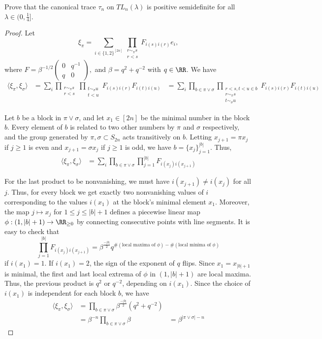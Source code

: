 \documentclass{article}
\begin{document}
 Prove that the canonical trace $\tau_n$ on $TL_n(\lambda)$ is positive semidefinite for all $\lambda \in (0, \frac{1}{4}]$.
  \begin{proof}
    Let $$\xi_\pi = \sum_{i \in \{1,2\}^{[2n]}} \prod_{\substack{r \sim_\pi s\\ r< s}} F_{i(s)i(r)} e_i,$$
      where $F = \beta^{-1/2} \begin{pmatrix} 0 & q^{-1} \\ q & 0 \end{pmatrix},$ and $\beta = q^2 + q^{-2}$ with $q \in \RR$.   We have
      \begin{align*}
        \langle \xi_\pi, \xi_\sigma \rangle & = \sum_i \prod_{\substack{r \sim_\pi s\\ r < s}} \prod_{\substack{t \sim_\sigma u\\ t < u}} F_{i(s)i(r)} F_{i(t) i(u)} 
        & = \sum_i \prod_{b \in \pi \vee \sigma} \prod_{\substack{r<s, t<u \in b\\ r \sim_\pi s \\ t \sim_\sigma u }} F_{i(s)i(r)} F_{i(t) i(u)} 
      \end{align*}

      Let $b$ be a block in $\pi \vee \sigma$, and let $x_1 \in [2n]$ be the minimal number in the block $b$.  Every element of $b$ is related to two other numbers by $\pi$ and $\sigma$ respectively, and the group generated by $\pi, \sigma \subset S_{2n}$ acts transitively on $b$.  Letting $x_{j+1} = \pi x_{j}$ if $j \ge 1$ is even and $x_{j+1} = \sigma x_j$ if $j \ge 1$ is odd, we have $b = \{x_j\}_{j = 1}^{|b|}$.  Thus,
      \begin{align*}
        \langle \xi_\pi, \xi_\sigma \rangle &  = \sum_i \prod_{b \in \pi \vee \sigma} \prod_{j = 1}^{|b|} F_{i(x_j)i(x_{j+1})}  
      \end{align*}

      For the last product to be nonvanishing, we must have $i(x_{j+1}) \neq i(x_{j})$ for all $j$.  Thus, for every block we get exactly two nonvanishing values of $i$ corresponding to the values $i(x_1)$ at the block's minimal element $x_1$.  Moreover, the map $j \mapsto x_j$ for $1 \le j \le |b| + 1$ defines a piecewise linear map $\phi: (1, |b| +1) \to \RR_{\ge 0}$ by connecting consecutive points with line segments.  It is easy to check that
      $$ \prod_{j = 1}^{|b|} F_{i(x_j)i(x_{j+1})}   = \beta^{\frac{-|b|}{2}} q^{\# (\text{local maxima of } \phi)- \# (\text{local minima of } \phi)} $$
      if $i(x_1) = 1$.  If $i(x_1) = 2$, the sign of the exponent of $q$ flips.   Since $x_1 = x_{|b| + 1}$ is minimal, the first and last local extrema of $\phi$ in $(1, |b| + 1)$ are local maxima.  Thus, the previous product is $q^2$ or $q^{-2}$, depending on $i(x_1)$.  Since the choice of $i(x_1)$ is independent for each block $b$, we have
\begin{align*}
  \langle \xi_\pi, \xi_\sigma \rangle &  = \prod_{b \in \pi \vee \sigma} \beta^{\frac{-|b|}{2}} (q^2 + q^{-2})   \\
  & = \beta^{-n} \prod_{b \in \pi \vee \sigma} \beta
  & = \beta^{|\pi \vee \sigma| - n}
\end{align*}


\end{proof}
\end{document}
